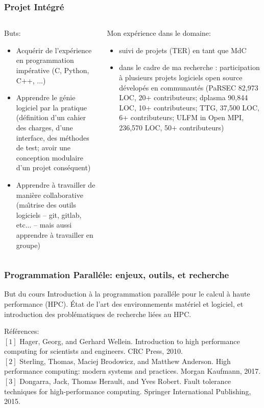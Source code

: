 \begin{frame}
  \frametitle{Projet Int\'egr\'e}

  \begin{columns}
    \begin{column}{.45\linewidth}\small
      Buts:
      \begin{itemize}
      \item Acqu\'erir de l'exp\'erience en programmation imp\'erative (C, Python, C++, ...)
      \item Apprendre le g\'enie logiciel par la pratique (d\'efinition d'un cahier des charges, d'une interface, des m\'ethodes de test; avoir une conception modulaire d'un projet cons\'equent)
      \item Apprendre \`a travailler de mani\`ere collaborative (ma\^\i{}trise des outils logiciels -- git, gitlab, etc... -- mais aussi apprendre \`a travailler en groupe)
      \end{itemize}
    \end{column}\begin{column}{.45\linewidth}\small
      Mon exp\'erience dans le domaine:
      \begin{itemize}
      \item suivi de projets (TER) en tant que MdC
      \item dans le cadre de ma recherche : participation \`a plusieurs projets logiciels open source d\'evelop\'es en communaut\'es (PaRSEC 82,973 LOC, 20+ contributeurs; dplasma 90,844 LOC, 10+ contributeurs; TTG, 37,500 LOC, 6+ contributeurs; ULFM in Open MPI, 236,570 LOC, 50+ contributeurs)
      \end{itemize}
    \end{column}
  \end{columns}
\end{frame}

\begin{frame}
  \frametitle{Programmation Parall\'ele: enjeux, outils, et recherche}

  \begin{beamerboxesrounded}{But du cours}
    Introduction \`a la programmation parall\'ele pour le calcul \`a haute performance (HPC). \'Etat de l'art des environnements mat\'eriel et logiciel, et introduction des probl\'ematiques de recherche li\'ees au HPC.
  \end{beamerboxesrounded}

  \bigskip
  
  \small R\'ef\'erences:\\
  $[1]$ Hager, Georg, and Gerhard Wellein. Introduction to high performance computing for scientists and engineers. CRC Press, 2010.\\
  $[2]$ Sterling, Thomas, Maciej Brodowicz, and Matthew Anderson. High performance computing: modern systems and practices. Morgan Kaufmann, 2017.\\
  $[3]$ Dongarra, Jack, Thomas Herault, and Yves Robert. Fault tolerance techniques for high-performance computing. Springer International Publishing, 2015.
  
\end{frame}

